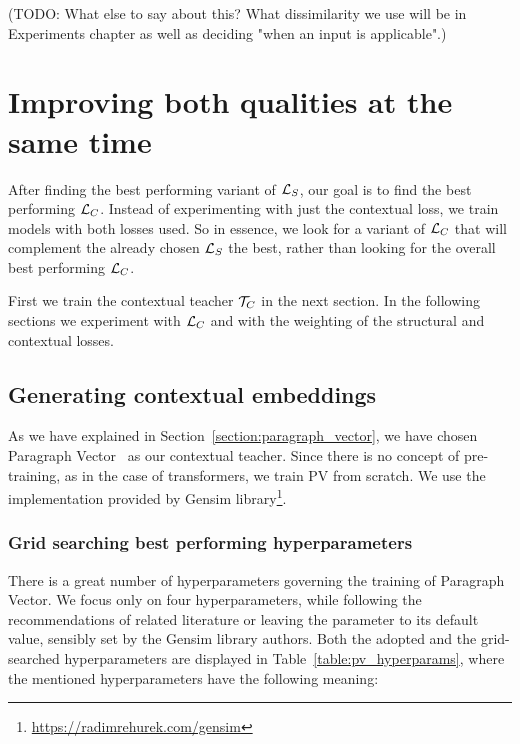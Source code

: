 (TODO: What else to say about this? What dissimilarity we use will be in
Experiments chapter as well as deciding "when an input is applicable".)


\section{Improving both qualities at the same time}\label{section:improving_both}

After finding the best performing variant of $\mathcal{L}_S$, our goal is to find the
best performing $\mathcal{L}_C$. Instead of experimenting with just the contextual
loss, we train models with both losses used. So in essence, we look for a
variant of $\mathcal{L}_C$ that will complement the already chosen $\mathcal{L}_S$ the best,
rather than looking for the overall best performing $\mathcal{L}_C$.

First we train the contextual teacher $\mathcal{T}_C$ in the next section. In the
following sections we experiment with $\mathcal{L}_C$ and with the weighting of the
structural and contextual losses.


\subsection{Generating contextual embeddings}\label{section:gen_contextual_embeds}


As we have explained in Section~\ref{section:paragraph_vector}, we have chosen
Paragraph Vector~\citep{le2014distributed} as our contextual teacher. Since
there is no concept of pre-training, as in the case of transformers, we train PV
from scratch. We use the implementation provided by Gensim
library\footnote{\label{fn:link_to_gensim}\url{https://radimrehurek.com/gensim}}.


\subsubsection{Grid searching best performing hyperparameters}

There is a great number of hyperparameters governing the training of Paragraph
Vector. We focus only on four hyperparameters, while following the
recommendations of related literature or leaving the parameter to its default
value, sensibly set by the Gensim library authors. Both the adopted and the
grid-searched hyperparameters are displayed in Table~\ref{table:pv_hyperparams},
where the mentioned hyperparameters have the following meaning:

